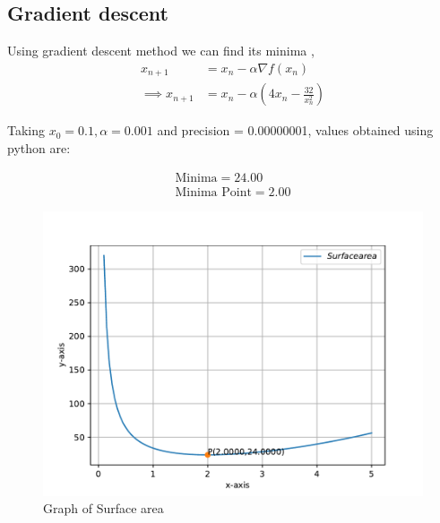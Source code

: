 \documentclass[journal,10pt,twocolumn]{article}
\providecommand{\brak}[1]{\ensuremath{\left(#1\right)}}
\begin{document}
\subsection*{\normalsize Gradient descent}
Using gradient descent method we can find its minima ,
    \begin{align}
        x_{n+1} &= x_n - \alpha \nabla f(x_n) \\
        \implies x_{n+1} &= x_n - \alpha \brak{4x_n - \frac{32}{x_n^2}}
    \end{align}
   
Taking $x_0=0.1,\alpha=0.001$ and precision = 0.00000001, values obtained using python are:
    
    \begin{align}
        \boxed{\text{Minima} = 24.00}\\
        \boxed{\text{Minima Point} = 2.00}
    \end{align}
\begin{figure}[t]
 \centering
 \includegraphics[width=1\columnwidth]{opt.pdf}
 \caption{Graph of Surface area}
 \label{fig:graph_fx}
\end{figure}
\end{document}
